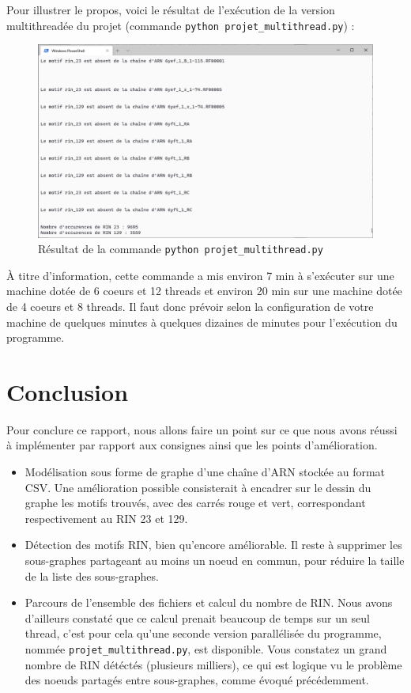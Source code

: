 \documentclass[11pt,a4paper]{article}
\begin{document}
Pour illustrer le propos, voici le résultat de l'exécution de la version multithreadée du projet (commande \texttt{python projet\_multithread.py}) :
\begin{figure}[!h]
\centering \includegraphics[scale=0.6]{screenshot.png}
\caption{Résultat de la commande \texttt{python projet\_multithread.py}}
\end{figure}

À titre d'information, cette commande a mis environ 7 min à s'exécuter sur une machine dotée de 6 coeurs et 12 threads et environ 20 min sur une machine dotée de 4 coeurs et 8 threads. Il faut donc prévoir selon la configuration de votre machine de quelques minutes à quelques dizaines de minutes pour l'exécution du programme.

\section{Conclusion}
Pour conclure ce rapport, nous allons faire un point sur ce que nous avons réussi à implémenter par rapport aux consignes ainsi que les points d'amélioration.\\
\begin{itemize}
\item Modélisation sous forme de graphe d'une chaîne d'ARN stockée au format CSV. Une amélioration possible consisterait à encadrer sur le dessin du graphe les motifs trouvés, avec des carrés rouge et vert, correspondant respectivement au RIN 23 et 129. 
\item Détection des motifs RIN, bien qu'encore améliorable. Il reste à supprimer les sous-graphes partageant au moins un noeud en commun, pour réduire la taille de la liste des sous-graphes.
\item Parcours de l'ensemble des fichiers et calcul du nombre de RIN. Nous avons d'ailleurs constaté que ce calcul prenait beaucoup de temps sur un seul thread, c'est pour cela qu'une seconde version parallélisée du programme, nommée \texttt{projet\_multithread.py}, est disponible. Vous constatez un grand nombre de RIN détéctés (plusieurs milliers), ce qui est logique vu le problème des noeuds partagés entre sous-graphes, comme évoqué précédemment.
\end{itemize}
\end{document}
